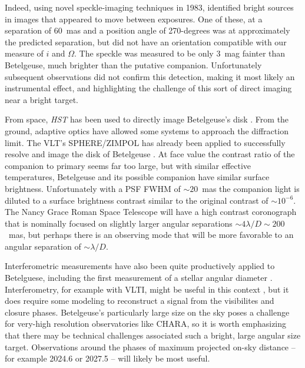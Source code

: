 \documentclass[twocolumn]{aastex631}
\begin{document}
Indeed, using novel speckle-imaging techniques in 1983, \citet{1986ApJ...308..260K} identified bright sources in images that appeared to move between exposures. One of these, at a separation of 60~mas and a position angle of 270-degrees was at approximately the predicted separation, but did not have an orientation compatible with our measure of $i$ and $\Omega$. The speckle was measured to be only 3~mag fainter than Betelgeuse, much brighter than the putative companion.  Unfortunately subsequent observations did not confirm this detection, making it most likely an instrumental effect, and highlighting the challenge of this sort of direct imaging near a bright target. 


From space, {\it HST} has been used to directly image Betelgeuse's disk \citep{1996ApJ...463L..29G}. From the ground, adaptive optics have allowed some systems to approach the diffraction limit. The VLT's SPHERE/ZIMPOL has already been applied to successfully resolve and image the disk of Betelgeuse \citep[e.g.][]{2016A&A...585A..28K,2021Natur.594..365M}. At face value the contrast ratio of the companion to primary seems far too large, but with similar effective temperatures, Betelgeuse and its possible companion have similar surface brightness. Unfortunately with a PSF FWHM of $\sim 20$~mas \citep{2016A&A...585A..28K} the companion light is diluted to a surface brightness contrast similar to the original contrast of $\sim 10^{-6}$. The Nancy Grace Roman Space Telescope will have a high contrast coronograph that is nominally focused on slightly larger angular separations $\sim4 \lambda/D \sim 200$~mas, but perhaps there is an observing mode that will be more favorable to an angular separation of $\sim \lambda/D$.   

Interferometric measurements have also been quite productively applied to Betelguese, including the first measurement of a stellar angular diameter \citep{1921ApJ....53..249M}. Interferometry, for example with VLTI, might be useful in this context \citep[e.g. ][]{2016A&A...588A.130M,2023A&A...675A..46C,2024MNRAS.527L..88D}, but it does require some modeling to reconstruct a signal from the visibilites and closure phases.  Betelgeuse's particularly large size on the sky poses a challenge for very-high resolution observatories like CHARA, so it is worth emphasizing that there may be technical challenges associated such a bright, large angular size target. 
Observations around the phases of maximum projected on-sky distance -- for example 2024.6 or 2027.5  -- will likely be most useful. 
\end{document}
